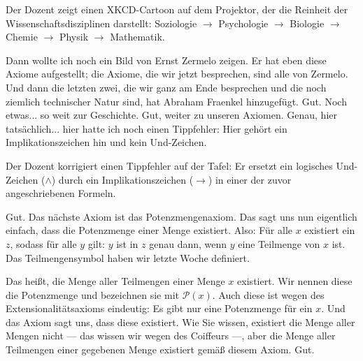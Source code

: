 \begin{meta-note}
Der Dozent zeigt einen XKCD-Cartoon auf dem Projektor, der die Reinheit der Wissenschaftsdisziplinen darstellt: Soziologie $\to$ Psychologie $\to$ Biologie $\to$ Chemie $\to$ Physik $\to$ Mathematik.
\end{meta-note}

\begin{spoken-clean}[00:41:07 - 00:41:37]
Dann wollte ich noch ein Bild von Ernst Zermelo zeigen. Er hat eben diese Axiome aufgestellt; die Axiome, die wir jetzt besprechen, sind alle von Zermelo. Und dann die letzten zwei, die wir ganz am Ende besprechen und die noch ziemlich technischer Natur sind, hat Abraham Fraenkel hinzugefügt. Gut. Noch etwas... so weit zur Geschichte. Gut, weiter zu unseren Axiomen. Genau, hier tatsächlich... hier hatte ich noch einen Tippfehler: Hier gehört ein Implikationszeichen hin und kein Und-Zeichen.
\end{spoken-clean}

\begin{meta-note}[Tafelkorrektur]
Der Dozent korrigiert einen Tippfehler auf der Tafel: Er ersetzt ein logisches Und-Zeichen ($\land$) durch ein Implikationszeichen ($\rightarrow$) in einer der zuvor angeschriebenen Formeln.
\end{meta-note}

\begin{spoken-clean}[00:41:37 - 00:43:31]
Gut. Das nächste Axiom ist das Potenzmengenaxiom. Das sagt uns nun eigentlich einfach, dass die Potenzmenge einer Menge existiert. Also: Für alle $x$ existiert ein $z$, sodass für alle $y$ gilt: $y$ ist in $z$ genau dann, wenn $y$ eine Teilmenge von $x$ ist. Das Teilmengensymbol haben wir letzte Woche definiert.

Das heißt, die Menge aller Teilmengen einer Menge $x$ existiert. Wir nennen diese die Potenzmenge und bezeichnen sie mit $\mathcal{P}(x)$. Auch diese ist wegen des Extensionalitätsaxioms eindeutig: Es gibt nur eine Potenzmenge für ein $x$. Und das Axiom sagt uns, dass diese existiert. Wie Sie wissen, existiert die Menge aller Mengen nicht --- das wissen wir wegen des Coiffeurs ---, aber die Menge aller Teilmengen einer gegebenen Menge existiert gemäß diesem Axiom. Gut.
\end{spoken-clean}

